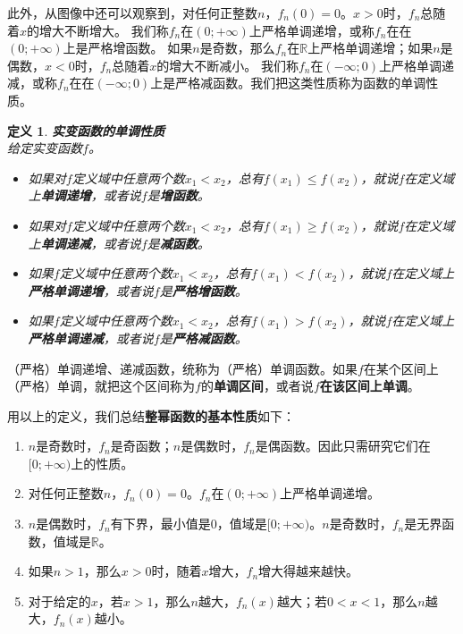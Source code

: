 \documentclass[12pt,UTF8]{ctexbook}
\newtheorem{df}{定义}[section]
\begin{document}
此外，从图像中还可以观察到，对任何正整数$n$，$f_n(0) = 0$。$x>0$时，$f_n$总随着$x$的增大不断增大。
我们称$f_n$在$(0; +\infty)$上严格单调递增，或称$f_n$在在$(0; +\infty)$上是严格增函数。
如果$n$是奇数，那么$f_n$在$\mathbb{R}$上严格单调递增；如果$n$是偶数，$x<0$时，$f_n$总随着$x$的增大不断减小。
我们称$f_n$在$(-\infty; 0)$上严格单调递减，或称$f_n$在在$(-\infty; 0)$上是严格减函数。我们把这类性质称为函数的单调性质。
\begin{df}\textbf{实变函数的单调性质}\\
    给定实变函数$f$。
    \begin{itemize}
        \item 如果对$f$定义域中任意两个数$x_1 < x_2$，总有$f(x_1) \leqslant f(x_2)$，就说$f$在定义域上\textbf{单调递增}，或者说$f$是\textbf{增函数}。
        \item 如果对$f$定义域中任意两个数$x_1 < x_2$，总有$f(x_1) \geqslant f(x_2)$，就说$f$在定义域上\textbf{单调递减}，或者说$f$是\textbf{减函数}。
        \item 如果$f$定义域中任意两个数$x_1 < x_2$，总有$f(x_1) < f(x_2)$，就说$f$在定义域上\textbf{严格单调递增}，或者说$f$是\textbf{严格增函数}。
        \item 如果$f$定义域中任意两个数$x_1 < x_2$，总有$f(x_1) > f(x_2)$，就说$f$在定义域上\textbf{严格单调递减}，或者说$f$是\textbf{严格减函数}。   
    \end{itemize}
\end{df}

（严格）单调递增、递减函数，统称为（严格）单调函数。如果$f$在某个区间上（严格）单调，就把这个区间称为$f$的\textbf{单调区间}，或者说$f$\textbf{在该区间上单调}。

用以上的定义，我们总结\textbf{整幂函数的基本性质}如下：
\begin{enumerate}
    \item $n$是奇数时，$f_n$是奇函数；$n$是偶数时，$f_n$是偶函数。因此只需研究它们在$[0; +\infty)$上的性质。
    \item 对任何正整数$n$，$f_n(0) = 0$。$f_n$在$(0; +\infty)$上严格单调递增。
    \item $n$是偶数时，$f_n$有下界，最小值是$0$，值域是$[0; +\infty)$。$n$是奇数时，$f_n$是无界函数，值域是$\mathbb{R}$。
    \item 如果$n>1$，那么$x>0$时，随着$x$增大，$f_n$增大得越来越快。
    \item 对于给定的$x$，若$x>1$，那么$n$越大，$f_n(x)$越大；若$0 < x<1$，那么$n$越大，$f_n(x)$越小。
\end{enumerate}
\end{document}
